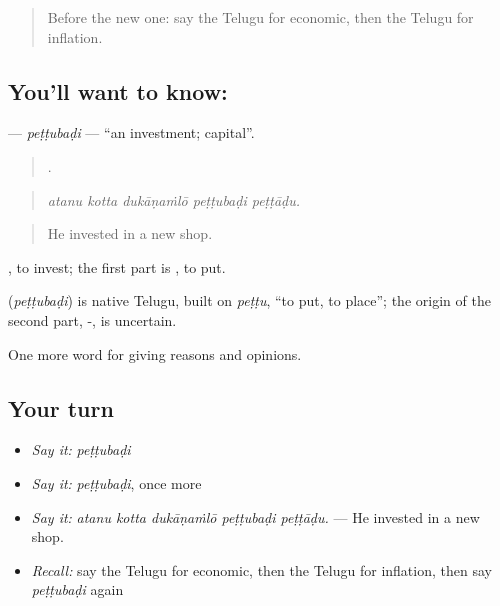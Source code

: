\label{lesson:TE-C405-pettubadi}



\begin{quote}
Before the new one: say the Telugu for economic, then the Telugu for inflation.
\end{quote}

\subsection*{You'll want to know: }
\textbf{} — \emph{peṭṭubaḍi} — \textquotedblleft{}an investment; capital\textquotedblright{}.

\begin{quote}
    .
\end{quote}

\begin{quote}
\emph{atanu kotta dukāṇaṁlō peṭṭubaḍi peṭṭāḍu.}
\end{quote}

\begin{quote}
He invested in a new shop.
\end{quote}

 , to invest; the first part is , to put.

\begin{cousinweb}
\textbf{} (\emph{peṭṭubaḍi}) is native Telugu, built on \emph{peṭṭu}, \textquotedblleft{}to put, to place\textquotedblright{}; the origin of the second part, -, is uncertain.
\end{cousinweb}

\begin{grammarlens}[title={What you've built}]
One more word for giving reasons and opinions.
\end{grammarlens}

\subsection*{Your turn}
\begin{itemize}
\raggedright
  \item \emph{Say it:} \emph{peṭṭubaḍi}
  \item \emph{Say it:} \emph{peṭṭubaḍi}, once more
  \item \emph{Say it:} \emph{atanu kotta dukāṇaṁlō peṭṭubaḍi peṭṭāḍu.} — He invested in a new shop.
  \item \emph{Recall:} say the Telugu for economic, then the Telugu for inflation, then say \emph{peṭṭubaḍi} again
\end{itemize}

